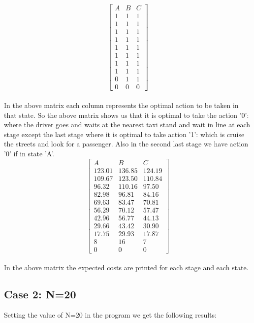 \documentclass{article}
\begin{document}
 \[
\begin{bmatrix}
    A      &  B &  C  \\
    1       & 1 & 1  \\
    1       & 1 & 1  \\
    1       & 1 & 1  \\
    1       & 1 & 1  \\
    1       & 1 & 1  \\
    1       & 1 & 1  \\
    1       & 1 & 1  \\
    1       & 1 & 1  \\
    0       & 1 & 1  \\
    0       & 0 & 0
\end{bmatrix}
\]
\\
In the above matrix each column represents the optimal action to be taken in that state. So the above matrix shows us that it is optimal to take the action '0': where the driver goes and waits at the nearest taxi stand and wait in line at each stage except the last stage where it is optimal to take action '1': which is cruise the streets and look for a passenger. Also in the second last stage we have action '0'  if in state 'A'.
\[
\begin{bmatrix}
A   &  B   &   C\\
123.01 & 136.85& 124.19\\
109.67& 123.50& 110.84\\
 96.32& 110.16& 97.50\\
 82.98& 96.81& 84.16\\
 69.63& 83.47& 70.81\\
 56.29& 70.12& 57.47\\
 42.96& 56.77& 44.13\\
 29.66& 43.42& 30.90\\
 17.75& 29.93& 17.87\\
 8&16& 7\\
 0& 0& 0
\end{bmatrix}
\]\\
In the above matrix the expected costs are printed for each stage and each state.\\

\subsection{Case 2: N=20}
Setting the value of N=20 in the program we get the following results:\\
\end{document}
